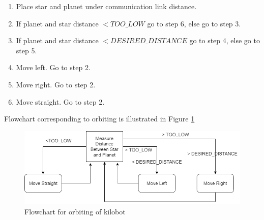 \begin{enumerate}
    \item Place star and planet under communication link distance.
    \item If planet and star distance $<TOO\_LOW$ go to step 6, else go to step 3.
    \item If planet and star distance $<DESIRED\_DISTANCE$ go to step 4, else go to step 5.
    \item Move left. Go to step 2.
    \item Move right. Go to step 2.
    \item Move straight. Go to step 2.
\end{enumerate}
Flowchart corresponding to orbiting is illustrated in Figure \ref{fig:orbit_flowchart}

\begin{figure}[H]
    \centering
    \includegraphics[scale=0.6]{images/orbiting}
    \caption{Flowchart for orbiting of kilobot}
    \label{fig:orbit_flowchart}
\end{figure}
